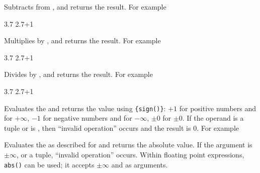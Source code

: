 \documentclass[oneside]{book}
\begin{document}
\begin{function}{\fpMathSub}
\begin{syntax}
  
\end{syntax}
Subtracts  from ,
and returns the result. For example
\begin{demohigh}
 {3.7}
 {2.7+1}
\end{demohigh}
\end{function}

\begin{function}{\fpMathMult}
\begin{syntax}
  
\end{syntax}
Multiplies  by ,
and returns the result. For example
\begin{demohigh}
 {3.7}
 {2.7+1}
\end{demohigh}
\end{function}

\begin{function}{\fpMathDiv}
\begin{syntax}
  
\end{syntax}
Divides  by ,
and returns the result. For example
\begin{demohigh}
 {3.7}
 {2.7+1}
\end{demohigh}
\end{function}

\begin{function}{\fpMathSign}
\begin{syntax}
 
\end{syntax}
Evaluates the  and returns the value
using \verb|{sign(|\verb|)}|: $+1$ for positive
numbers and for $+\infty$, $-1$ for negative numbers and for
$-\infty$, $\pm 0$ for $\pm 0$.  If the operand is a tuple or is
\nan{}, then \enquote{invalid operation} occurs and the result
is $0$. For example
\begin{demohigh}
\end{demohigh}
\end{function}

\begin{function}{\fpMathAbs}
\begin{syntax}
 
\end{syntax}
Evaluates the  as described for
 and returns the absolute value.
If the argument is $\pm\infty$, \nan{} or a tuple,
\enquote{invalid operation} occurs.  Within floating point
expressions, \verb|abs()| can be used; it accepts $\pm\infty$ and \nan{}
as arguments.
\end{function}
\end{document}

